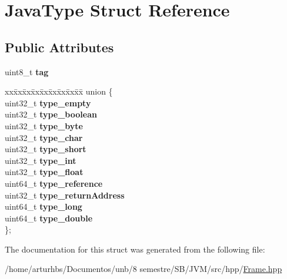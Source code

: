 \hypertarget{structJavaType}{}\section{Java\+Type Struct Reference}
\label{structJavaType}
\subsection*{Public Attributes}
\begin{DoxyCompactItemize}
\item 
uint8\+\_\+t {\bfseries tag}\hypertarget{structJavaType_a1f53e5f39b5665033e70d1b56e4101d1}{}\label{structJavaType_a1f53e5f39b5665033e70d1b56e4101d1}

\item 
\begin{tabbing}
xx\=xx\=xx\=xx\=xx\=xx\=xx\=xx\=xx\=\kill
union \{\\
\>uint32\_t {\bfseries type\_empty}\\
\>uint32\_t {\bfseries type\_boolean}\\
\>uint32\_t {\bfseries type\_byte}\\
\>uint32\_t {\bfseries type\_char}\\
\>uint32\_t {\bfseries type\_short}\\
\>uint32\_t {\bfseries type\_int}\\
\>uint32\_t {\bfseries type\_float}\\
\>uint64\_t {\bfseries type\_reference}\\
\>uint32\_t {\bfseries type\_returnAddress}\\
\>uint64\_t {\bfseries type\_long}\\
\>uint64\_t {\bfseries type\_double}\\
\}; \hypertarget{structJavaType_aac519cb72d6be70c0fbea8b5ba1bd150}{}\label{structJavaType_aac519cb72d6be70c0fbea8b5ba1bd150}
\\

\end{tabbing}\end{DoxyCompactItemize}


The documentation for this struct was generated from the following file\+:\begin{DoxyCompactItemize}
\item 
/home/arturhbs/\+Documentos/unb/8 semestre/\+S\+B/\+J\+V\+M/src/hpp/\hyperlink{Frame_8hpp}{Frame.\+hpp}\end{DoxyCompactItemize}
